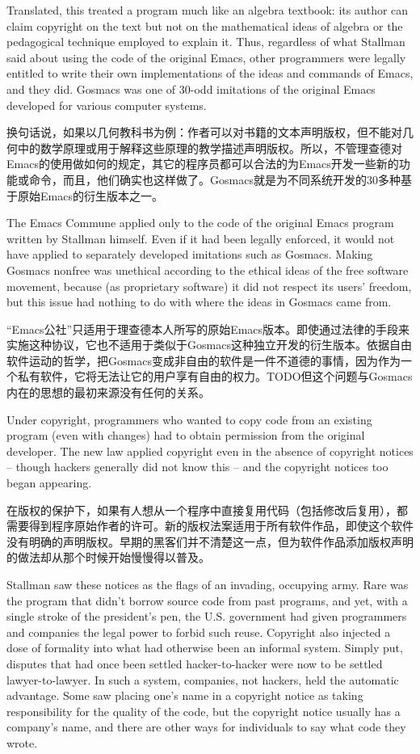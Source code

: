 \ifdefined\eng
Translated, this treated a program much like an algebra textbook: its author can claim copyright on the text but not on the mathematical ideas of algebra or the pedagogical technique employed to explain it.  Thus, regardless of what Stallman said about using the code of the original Emacs, other programmers were legally entitled to write their own implementations of the ideas and commands of Emacs, and they did.  Gosmacs was one of 30-odd imitations of the original Emacs developed for various computer systems.
\fi

\ifdefined\chs
换句话说，如果以几何教科书为例：作者可以对书籍的文本声明版权，但不能对几何中的数学原理或用于解释这些原理的教学描述声明版权。所以，不管理查德对Emacs的使用做如何的规定，其它的程序员都可以合法的为Emacs开发一些新的功能或命令，而且，他们确实也这样做了。Gosmacs就是为不同系统开发的30多种基于原始Emacs的衍生版本之一。
\fi

\ifdefined\eng
The Emacs Commune applied only to the code of the original Emacs program written by Stallman himself.  Even if it had been legally enforced, it would not have applied to separately developed imitations such as Gosmacs.  Making Gosmacs nonfree was unethical according to the ethical ideas of the free software movement, because (as proprietary software) it did not respect its users' freedom, but this issue had nothing to do with where the ideas in Gosmacs came from.
\fi

\ifdefined\chs
“Emacs公社”只适用于理查德本人所写的原始Emacs版本。即使通过法律的手段来实施这种协议，它也不适用于类似于Gosmacs这种独立开发的衍生版本。依据自由软件运动的哲学，把Gosmacs变成非自由的软件是一件不道德的事情，因为作为一个私有软件，它将无法让它的用户享有自由的权力。TODO但这个问题与Gosmacs内在的思想的最初来源没有任何的关系。
\fi

\ifdefined\eng
Under copyright, programmers who wanted to copy code from an existing program (even with changes) had to obtain permission from the original developer. The new law applied copyright even in the absence of copyright notices -- though hackers generally did not know this -- and the copyright notices too began appearing.
\fi

\ifdefined\chs
在版权的保护下，如果有人想从一个程序中直接复用代码（包括修改后复用），都需要得到程序原始作者的许可。新的版权法案适用于所有软件作品，即使这个软件没有明确的声明版权。早期的黑客们并不清楚这一点，但为软件作品添加版权声明的做法却从那个时候开始慢慢得以普及。
\fi

\ifdefined\eng
Stallman saw these notices as the flags of an invading, occupying army. Rare was the program that didn't borrow source code from past programs, and yet, with a single stroke of the president's pen, the U.S. government had given programmers and companies the legal power to forbid such reuse.  Copyright also injected a dose of formality into what had otherwise been an informal system. Simply put, disputes that had once been settled hacker-to-hacker were now to be settled lawyer-to-lawyer. In such a system, companies, not hackers, held the automatic advantage.  Some saw placing one's name in a copyright notice as taking responsibility for the quality of the code, but the copyright notice usually has a company's name, and there are other ways for individuals to say what code they wrote.
\fi

